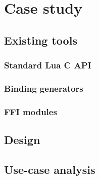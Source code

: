 \cleardoublepage
\chapter{Case study}

\section{Existing tools}

\subsection{Standard Lua C API}
\subsection{Binding generators}
\subsection{FFI modules}

\section{Design}

\section{Use-case analysis}
